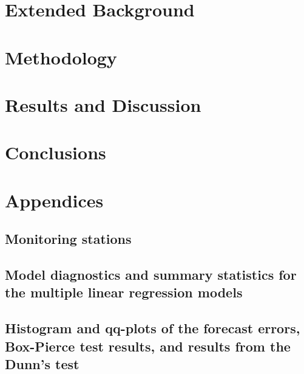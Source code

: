 \documentclass[12pt]{report}
\numberwithin{equation}{section}
\begin{document}
\chapter{Extended Background}


\chapter{Methodology}


\chapter{Results and Discussion}


\chapter{Conclusions}


{}

%

%
\chapter*{Appendices}
\setcounter{section}{0}
\renewcommand\thesection{\Alph{section}}

\section{Monitoring stations}

\section{Model diagnostics and summary statistics for the multiple linear regression models}

\section{Histogram and qq-plots of the forecast errors, Box-Pierce test results, and results from the Dunn's test}

\end{document}

